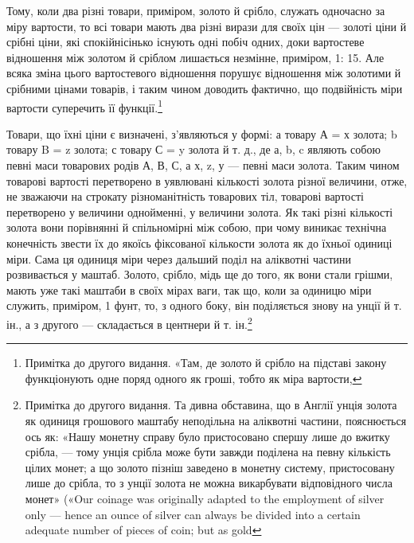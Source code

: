 Тому, коли два різні товари, приміром, золото й срібло,
служать одночасно за міру вартости, то всі товари мають два
різні вирази для своїх цін — золоті ціни й срібні ціни, які спокійнісінько
існують одні побіч одних, доки вартостеве відношення
між золотом й сріблом лишається незмінне, приміром,
1: 15. Але всяка зміна цього вартостевого відношення порушує
відношення між золотими й срібними цінами товарів, і таким
чином доводить фактично, що подвійність міри вартости суперечить
її функції.\footnote{
Примітка до другого видання. «Там, де золото й срібло на підставі
закону функціонують одне поряд одного як гроші, тобто як міра вартости,
}

Товари, що їхні ціни є визначені, з’являються у формі: а товару А = х золота; b товару B = z золота;
с товару С = y золота й т. д., де а, b, c являють собою певні маси товарових родів А, В, С, а х, z,
у — певні маси золота. Таким чином товарові вартості перетворено в уявлювані кількості золота різної
величини, отже, не зважаючи на строкату різноманітність товарових тіл, товарові вартості перетворено
у величини однойменні, у величини золота. Як такі різні кількості золота вони порівнянні й
спільномірні між собою, при чому виникає технічна конечність звести їх до якоїсь фіксованої
кількости золота як до їхньої одиниці міри. Сама ця одиниця міри через дальший поділ на
аліквотні частини розвивається у маштаб. Золото, срібло, мідь ще до того, як вони стали грішми,
мають уже такі маштаби в своїх мірах ваги, так що, коли за одиницю міри служить, приміром, 1 фунт,
то, з одного боку, він поділяється знову на унції й т. ін., а з другого — складається в центнери й
т. ін.\footnote{
Примітка до другого видання. Та дивна обставина, що в Англії унція золота як одиниця грошового
маштабу неподільна на аліквотні частини, пояснюється ось як: «Нашу монетну справу було пристосовано
спершу лише до вжитку срібла, — тому унція срібла може бути завжди поділена на певну кількість цілих
монет; а що золото пізніш заведено в монетну систему, пристосовану лише до срібла, то з унції золота
не можна
викарбувати відповідного числа монет» («Our coinage was originally adapted to the employment of
silver only — hence an ounce of silver can always be divided into a certain adequate number of
pieces of coin; but as gold
}

